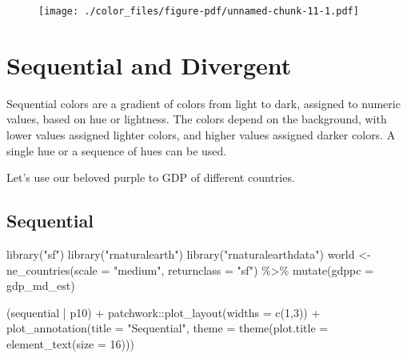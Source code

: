 \documentclass[
  letterpaper,
]{book}
\newenvironment{Shaded}{\begin{snugshade}}{\end{snugshade}}
\newcommand{\AttributeTok}[1]{\textcolor[rgb]{0.40,0.45,0.13}{#1}}
\newcommand{\DecValTok}[1]{\textcolor[rgb]{0.68,0.00,0.00}{#1}}
\newcommand{\FunctionTok}[1]{\textcolor[rgb]{0.28,0.35,0.67}{#1}}
\newcommand{\NormalTok}[1]{\textcolor[rgb]{0.00,0.23,0.31}{#1}}
\newcommand{\OtherTok}[1]{\textcolor[rgb]{0.00,0.23,0.31}{#1}}
\newcommand{\SpecialCharTok}[1]{\textcolor[rgb]{0.37,0.37,0.37}{#1}}
\newcommand{\StringTok}[1]{\textcolor[rgb]{0.13,0.47,0.30}{#1}}
\begin{document}
\begin{figure}[H]

{\centering \texttt{[image: ./color\_files/figure-pdf/unnamed-chunk-11-1.pdf]}

}

\end{figure}

\hypertarget{sequential-and-divergent}{%
\section{Sequential and Divergent}\label{sequential-and-divergent}}

Sequential colors are a gradient of colors from light to dark, assigned
to numeric values, based on hue or lightness. The colors depend on the
background, with lower values assigned lighter colors, and higher values
assigned darker colors. A single hue or a sequence of hues can be used.

Let's use our beloved purple to GDP of different countries.

\hypertarget{sequential}{%
\subsection{Sequential}\label{sequential}}

\begin{Shaded}
\begin{Highlighting}[]
\FunctionTok{library}\NormalTok{(}\StringTok{"sf"}\NormalTok{)}
\FunctionTok{library}\NormalTok{(}\StringTok{"rnaturalearth"}\NormalTok{)}
\FunctionTok{library}\NormalTok{(}\StringTok{"rnaturalearthdata"}\NormalTok{)}
\NormalTok{world }\OtherTok{\textless{}{-}} \FunctionTok{ne\_countries}\NormalTok{(}\AttributeTok{scale =} \StringTok{"medium"}\NormalTok{, }\AttributeTok{returnclass =} \StringTok{"sf"}\NormalTok{) }\SpecialCharTok{\%\textgreater{}\%} \FunctionTok{mutate}\NormalTok{(}\AttributeTok{gdppc =}\NormalTok{ gdp\_md\_est) }
\end{Highlighting}
\end{Shaded}

\begin{Shaded}
\begin{Highlighting}[]
\NormalTok{(sequential }\SpecialCharTok{|}\NormalTok{ p10) }\SpecialCharTok{+} 
\NormalTok{  patchwork}\SpecialCharTok{::}\FunctionTok{plot\_layout}\NormalTok{(}\AttributeTok{widths =} \FunctionTok{c}\NormalTok{(}\DecValTok{1}\NormalTok{,}\DecValTok{3}\NormalTok{)) }\SpecialCharTok{+} 
  \FunctionTok{plot\_annotation}\NormalTok{(}\AttributeTok{title =} \StringTok{"Sequential"}\NormalTok{,}
                  \AttributeTok{theme =} \FunctionTok{theme}\NormalTok{(}\AttributeTok{plot.title =} \FunctionTok{element\_text}\NormalTok{(}\AttributeTok{size =} \DecValTok{16}\NormalTok{)))}
\end{Highlighting}
\end{Shaded}
\end{document}
